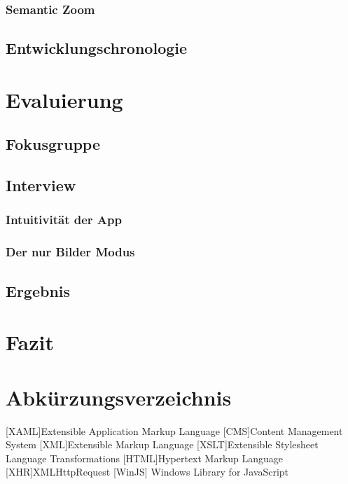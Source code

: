 \documentclass[12pt,a4paper]{scrartcl}
\begin{document}
\subsubsection{Semantic Zoom}
\label{subsubsec:semanticzoom}

\subsection{Entwicklungschronologie}
\label{subsec:entwicklungschronologie}


\newpage
\section{Evaluierung} 
\label{sec:evaluierung}

\subsection{Fokusgruppe}
\label{subsec:fokusgruppe}

\subsection{Interview}
\label{subsec:interview}

\subsubsection{Intuitivität der App} 
\label{subsubsec:intuitivitätderapp}

\subsubsection{Der nur Bilder Modus}
\label{subsubsec:nurbildermodus}

\subsection{Ergebnis}
\label{subsec:ergebnis}

\newpage
\section{Fazit}
\label{sec:fazit}

\newpage
\section*{Abkürzungsverzeichnis}
\label{sec:abkürzungen}
\begin{acronym}[SEPSEP]
	[XAML]{Extensible Application Markup Language}
	 [CMS]{Content Management System}
	 [XML]{Extensible Markup Language}
	[XSLT]{Extensible Stylesheet Language Transformations}
	[HTML]{Hypertext Markup Language}
	[XHR]{XMLHttpRequest}
	[WinJS] {Windows Library for JavaScript}
\end{acronym}

\newpage
\begin{singlespace}
	
	
\end{singlespace}

\newpage
\listoffigures

\newpage
\lstlistoflistings
\end{document}
